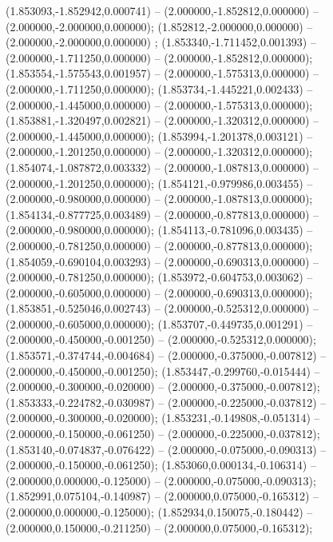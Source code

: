  (1.853093,-1.852942,0.000741) -- (2.000000,-1.852812,0.000000) -- (2.000000,-2.000000,0.000000);
 (1.852812,-2.000000,0.000000) -- (2.000000,-2.000000,0.000000) ;
 (1.853340,-1.711452,0.001393) -- (2.000000,-1.711250,0.000000) -- (2.000000,-1.852812,0.000000);
 (1.853554,-1.575543,0.001957) -- (2.000000,-1.575313,0.000000) -- (2.000000,-1.711250,0.000000);
 (1.853734,-1.445221,0.002433) -- (2.000000,-1.445000,0.000000) -- (2.000000,-1.575313,0.000000);
 (1.853881,-1.320497,0.002821) -- (2.000000,-1.320312,0.000000) -- (2.000000,-1.445000,0.000000);
 (1.853994,-1.201378,0.003121) -- (2.000000,-1.201250,0.000000) -- (2.000000,-1.320312,0.000000);
 (1.854074,-1.087872,0.003332) -- (2.000000,-1.087813,0.000000) -- (2.000000,-1.201250,0.000000);
 (1.854121,-0.979986,0.003455) -- (2.000000,-0.980000,0.000000) -- (2.000000,-1.087813,0.000000);
 (1.854134,-0.877725,0.003489) -- (2.000000,-0.877813,0.000000) -- (2.000000,-0.980000,0.000000);
 (1.854113,-0.781096,0.003435) -- (2.000000,-0.781250,0.000000) -- (2.000000,-0.877813,0.000000);
 (1.854059,-0.690104,0.003293) -- (2.000000,-0.690313,0.000000) -- (2.000000,-0.781250,0.000000);
 (1.853972,-0.604753,0.003062) -- (2.000000,-0.605000,0.000000) -- (2.000000,-0.690313,0.000000);
 (1.853851,-0.525046,0.002743) -- (2.000000,-0.525312,0.000000) -- (2.000000,-0.605000,0.000000);
 (1.853707,-0.449735,0.001291) -- (2.000000,-0.450000,-0.001250) -- (2.000000,-0.525312,0.000000);
 (1.853571,-0.374744,-0.004684) -- (2.000000,-0.375000,-0.007812) -- (2.000000,-0.450000,-0.001250);
 (1.853447,-0.299760,-0.015444) -- (2.000000,-0.300000,-0.020000) -- (2.000000,-0.375000,-0.007812);
 (1.853333,-0.224782,-0.030987) -- (2.000000,-0.225000,-0.037812) -- (2.000000,-0.300000,-0.020000);
 (1.853231,-0.149808,-0.051314) -- (2.000000,-0.150000,-0.061250) -- (2.000000,-0.225000,-0.037812);
 (1.853140,-0.074837,-0.076422) -- (2.000000,-0.075000,-0.090313) -- (2.000000,-0.150000,-0.061250);
 (1.853060,0.000134,-0.106314) -- (2.000000,0.000000,-0.125000) -- (2.000000,-0.075000,-0.090313);
 (1.852991,0.075104,-0.140987) -- (2.000000,0.075000,-0.165312) -- (2.000000,0.000000,-0.125000);
 (1.852934,0.150075,-0.180442) -- (2.000000,0.150000,-0.211250) -- (2.000000,0.075000,-0.165312);

